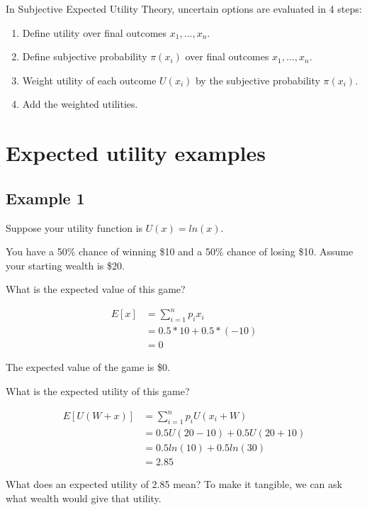 \documentclass[
  letterpaper,
  DIV=11,
  numbers=noendperiod]{scrreprt}
\begin{document}
In Subjective Expected Utility Theory, uncertain options are evaluated
in 4 steps:

\begin{enumerate}
\def\labelenumi{\arabic{enumi}.}
\item
  Define utility over final outcomes \(x_1,...,x_n\).
\item
  Define subjective probability \(\pi(x_i)\) over final outcomes
  \(x_1,...,x_n\).
\item
  Weight utility of each outcome \(U(x_i)\) by the subjective
  probability \(\pi(x_i)\).
\item
  Add the weighted utilities.
\end{enumerate}

\hypertarget{expected-utility-examples}{%
\chapter{Expected utility examples}\label{expected-utility-examples}}

\hypertarget{example-1-1}{%
\section{Example 1}\label{example-1-1}}

Suppose your utility function is \(U(x)=ln(x)\).

You have a 50\% chance of winning \$10 and a 50\% chance of losing \$10.
Assume your starting wealth is \$20.

What is the expected value of this game?

\begin{align*}
E[x]&=\sum_{i=1}^n p_ix_i \\[6pt]
&=0.5*10+0.5*(-10) \\[6pt]
&=0
\end{align*}

The expected value of the game is \$0.

What is the expected utility of this game?

\begin{align*}
E[U(W+x)]&=\sum_{i=1}^n p_iU(x_i+W) \\[6pt]
&=0.5U(20-10)+0.5U(20+10) \\[6pt]
&=0.5ln(10)+0.5ln(30) \\[6pt]
&=2.85
\end{align*}

What does an expected utility of 2.85 mean? To make it tangible, we can
ask what wealth would give that utility.
\end{document}
